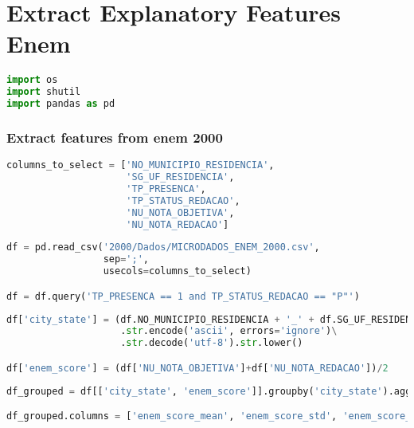 
\label{ape:extract_explanatory_features_enem}
\hypertarget{extract-explanatory-features}{%
\section{Extract Explanatory
Features Enem}\label{extract-explanatory-features}}

\begin{lstlisting}[language=Python]
import os
import shutil
import pandas as pd
\end{lstlisting}

\hypertarget{extract-features-from-enem-2000}{%
\subsubsection{Extract features from enem
2000}\label{extract-features-from-enem-2000}}

\begin{lstlisting}[language=Python]
columns_to_select = ['NO_MUNICIPIO_RESIDENCIA',
                     'SG_UF_RESIDENCIA',
                     'TP_PRESENCA',
                     'TP_STATUS_REDACAO',
                     'NU_NOTA_OBJETIVA',
                     'NU_NOTA_REDACAO']
\end{lstlisting}

\begin{lstlisting}[language=Python]
df = pd.read_csv('2000/Dados/MICRODADOS_ENEM_2000.csv',
                 sep=';',
                 usecols=columns_to_select)

df = df.query('TP_PRESENCA == 1 and TP_STATUS_REDACAO == "P"')
\end{lstlisting}

\begin{lstlisting}[language=Python]
df['city_state'] = (df.NO_MUNICIPIO_RESIDENCIA + '_' + df.SG_UF_RESIDENCIA).str.normalize('NFKD')\
                    .str.encode('ascii', errors='ignore')\
                    .str.decode('utf-8').str.lower()

df['enem_score'] = (df['NU_NOTA_OBJETIVA']+df['NU_NOTA_REDACAO'])/2
\end{lstlisting}

\begin{lstlisting}[language=Python]
df_grouped = df[['city_state', 'enem_score']].groupby('city_state').agg(['mean', 'std', 'median'])

df_grouped.columns = ['enem_score_mean', 'enem_score_std', 'enem_score_median']
\end{lstlisting}

